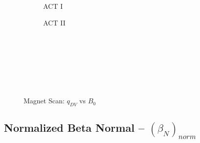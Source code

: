 \begin{figure*}[h!]
\begin{subfigure}[t]{0.45\textwidth}
\begin{adjustbox}{width=\textwidth}
      \Large
      
    \end{adjustbox}
        \caption{ACT I}
    \end{subfigure}
    \hfill
    \begin{subfigure}[t]{0.45\textwidth}
        \centering
    \begin{adjustbox}{width=\textwidth}
      \Large
      
    \end{adjustbox}
        \caption{ACT II}
    \end{subfigure}
    \hfill \hfill ~\\ ~\\ ~\\ ~\\
  \caption[]{Magnet Scan: $q_{DV}$ vs $B_0$} ~\\
\end{figure*}


\clearpage

\newpage

\subsection*{ Normalized Beta Normal -- $(\beta_N)_{norm} $ }
  \label{subsection:scan_norm_beta_N}

